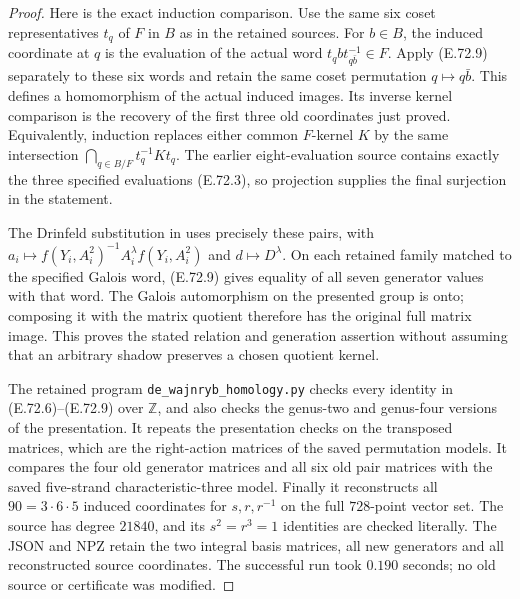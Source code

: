 \begin{proof}
Here is the exact induction comparison.  Use the same six coset
representatives $t_q$ of $F$ in $B$ as in the retained sources.
For $b\in B$, the induced coordinate at $q$ is the evaluation
of the actual word $t_q b t_{q\bar b}^{-1}\in F$.
Apply (E.72.9) separately to these six words and retain the same
coset permutation $q\mapsto q\bar b$.  This defines a homomorphism
of the actual induced images.  Its inverse kernel comparison is
the recovery of the first three old coordinates just proved.
Equivalently, induction replaces either common $F$-kernel $K$
by the same intersection $\bigcap_{q\in B/F}t_q^{-1}Kt_q$.
The earlier eight-evaluation source contains exactly the three
specified evaluations (E.72.3), so projection supplies the final
surjection in the statement.

The Drinfeld substitution in
\cite[Theorem 1.1 and Proposition 4.3]{DE_LochakNakamuraSchneps2026}
uses precisely these pairs, with
$a_i\mapsto f(Y_i,A_i^2)^{-1}A_i^\lambda f(Y_i,A_i^2)$ and
$d\mapsto D^\lambda$.  On each retained family matched to the
specified Galois word, (E.72.9) gives equality of all seven
generator values with that word.  The Galois automorphism on the
presented group is onto; composing it with the matrix quotient
therefore has the original full matrix image.  This proves the
stated relation and generation assertion without assuming that
an arbitrary shadow preserves a chosen quotient kernel.

The retained program \texttt{de\_wajnryb\_homology.py} checks every
identity in (E.72.6)--(E.72.9) over $\mathbb Z$, and also checks
the genus-two and genus-four versions of the presentation.
It repeats the presentation checks on the transposed matrices,
which are the right-action matrices of the saved permutation
models.  It compares the four old generator matrices and all
six old pair matrices with the saved five-strand characteristic-three
model.  Finally it reconstructs all $90=3\cdot6\cdot5$ induced
coordinates for $s,r,r^{-1}$ on the full $728$-point vector set.
The source has degree $21840$, and its $s^2=r^3=1$ identities are
checked literally.  The JSON and NPZ retain the two integral
basis matrices, all new generators and all reconstructed source
coordinates.  The successful run took $0.190$ seconds; no old
source or certificate was modified.
\end{proof}
